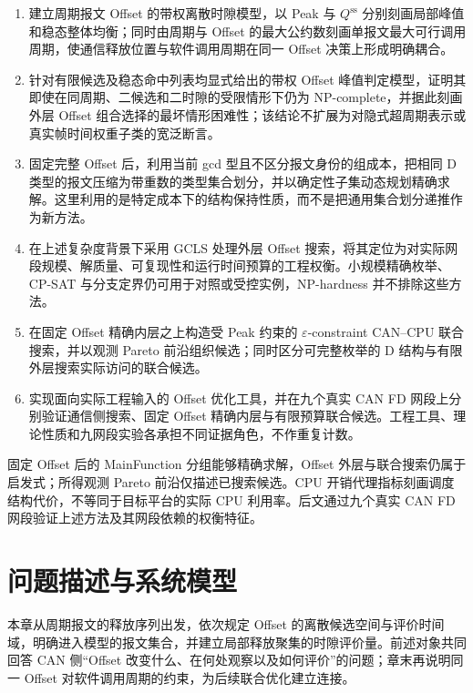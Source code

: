 \documentclass[UTF8,a4paper,twoside,zihao=-4]{ctexart}
\numberwithin{equation}{section}
\numberwithin{figure}{section}
\numberwithin{table}{section}
\theoremstyle{definition}
\numberwithin{algocf}{section}
\begin{document}
\begin{enumerate}
  \item 建立周期报文 Offset 的带权离散时隙模型，以 Peak 与 $Q^{\mathrm{ss}}$ 分别刻画局部峰值和稳态整体均衡；同时由周期与 Offset 的最大公约数刻画单报文最大可行调用周期，使通信释放位置与软件调用周期在同一 Offset 决策上形成明确耦合。

  \item 针对有限候选及稳态命中列表均显式给出的带权 Offset 峰值判定模型，证明其即使在同周期、二候选和二时隙的受限情形下仍为 NP-complete，并据此刻画外层 Offset 组合选择的最坏情形困难性；该结论不扩展为对隐式超周期表示或真实帧时间权重子类的宽泛断言。

  \item 固定完整 Offset 后，利用当前 gcd 型且不区分报文身份的组成本，把相同 D 类型的报文压缩为带重数的类型集合划分，并以确定性子集动态规划精确求解。这里利用的是特定成本下的结构保持性质，而不是把通用集合划分递推作为新方法。

  \item 在上述复杂度背景下采用 GCLS 处理外层 Offset 搜索，将其定位为对实际网段规模、解质量、可复现性和运行时间预算的工程权衡。小规模精确枚举、CP-SAT 与分支定界仍可用于对照或受控实例，NP-hardness 并不排除这些方法。

  \item 在固定 Offset 精确内层之上构造受 Peak 约束的 $\varepsilon$-constraint CAN--CPU 联合搜索，并以观测 Pareto 前沿组织候选；同时区分可完整枚举的 D 结构与有限外层搜索实际访问的联合候选。

  \item 实现面向实际工程输入的 Offset 优化工具，并在九个真实 CAN FD 网段上分别验证通信侧搜索、固定 Offset 精确内层与有限预算联合候选。工程工具、理论性质和九网段实验各承担不同证据角色，不作重复计数。
\end{enumerate}

固定 Offset 后的 MainFunction 分组能够精确求解，Offset 外层与联合搜索仍属于启发式；所得观测 Pareto 前沿仅描述已搜索候选。CPU 开销代理指标刻画调度结构代价，不等同于目标平台的实际 CPU 利用率。后文通过九个真实 CAN FD 网段验证上述方法及其网段依赖的权衡特征。

\clearpage
\section{问题描述与系统模型}

本章从周期报文的释放序列出发，依次规定 Offset 的离散候选空间与评价时间域，明确进入模型的报文集合，并建立局部释放聚集的时隙评价量。前述对象共同回答 CAN 侧“Offset 改变什么、在何处观察以及如何评价”的问题；章末再说明同一 Offset 对软件调用周期的约束，为后续联合优化建立连接。
\end{document}
